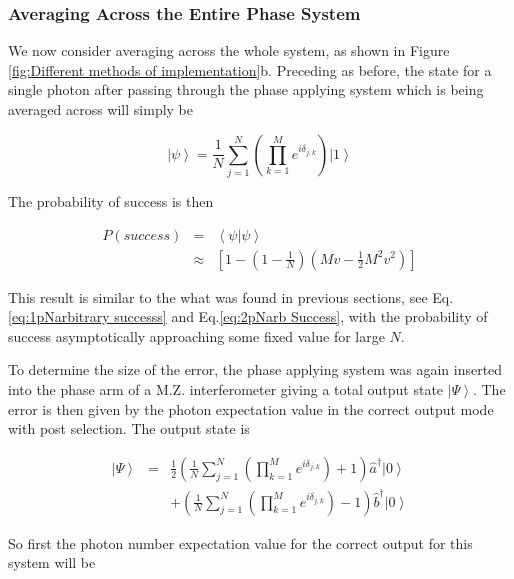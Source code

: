\documentclass[aps,pra,twocolumn,superscriptaddress,numerical]{revtex4-1}
\begin{document}
			
		\subsubsection{Averaging Across the Entire Phase System\label{Averaging Across the Entire Phase System}}
			
			We now consider averaging across the whole system, as shown in Figure  \ref{fig:Different methods of implementation}b. Preceding as before, the state for a single photon after passing through the phase applying system which is being averaged across will simply be
			
			\begin{equation}
				\left|\psi\right\rangle =\frac{1}{N}\sum_{j=1}^{N}\left(\prod_{k=1}^{M}e^{i\delta_{j,k}}\right)\left|1\right\rangle \label{eq:AvEndPhaseState}
			\end{equation}
			
			
			The probability of success is then
			
			\begin{eqnarray}
				P\left(success\right) & = & \left\langle \psi|\psi\right\rangle \nonumber \\
				& \approx & \left[1-\left(1-\frac{1}{N}\right)\left(Mv-\frac{1}{2}M^{2}v^{2}\right)\right]\label{eq:AveEndProbSuccess}
			\end{eqnarray}
			
			
			This result is similar to the what was found in previous sections, see Eq.\ref{eq:1pNarbitrary successs} and Eq.\ref{eq:2pNarb Success}, with the probability of success asymptotically approaching some fixed value for large $N$.
			
			To determine the size of the error, the phase applying system was again inserted into the phase arm of a M.Z. interferometer giving a total output state $\left|\Psi\right\rangle $. The error is then given by the photon expectation value in the correct output mode with post selection. The output state is
			
			\begin{eqnarray}
				\left|\Psi\right\rangle & = &\frac{1}{2}\left(\frac{1}{N}\sum_{j=1}^{N}\left(\prod_{k=1}^{M}e^{i\delta_{j,k}}\right)+1\right)\hat{a}^{\dagger}\left|0\right\rangle \\ & & +\left(\frac{1}{N}\sum_{j=1}^{N}\left(\prod_{k=1}^{M}e^{i\delta_{j,k}}\right)-1\right)\hat{b}^{\dagger}\left|0\right\rangle \label{eq:AveEndIntState}
			\end{eqnarray}
			
			
			So first the photon number expectation value for the correct output for this system will be
			
\end{document}
